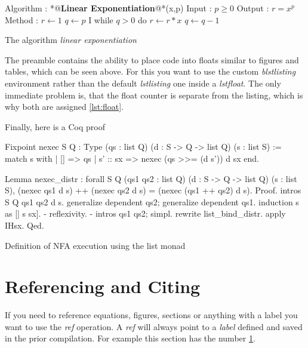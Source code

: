 \documentclass[a4, english]{article}
\begin{document}
\begin{lstfloat}
  \centering
  
  \begin{blstlisting}[firstnumber=1]
  Algorithm : *@\textbf{Linear Exponentiation}@*(x,p)
  Input     : $p \geq 0$
  Output    : $r = x^p$
  Method    : $r \leftarrow 1$
              $q \leftarrow p$
              {I} while $q > 0$ do
                  $r \leftarrow r * x$
                  $q \leftarrow q - 1$
  \end{blstlisting}

  \caption{The algorithm \emph{linear exponentiation}}
  \label{lst:float}
\end{lstfloat}

The preamble contains the ability to place code into floats similar to
figures and tables, which can be seen above. For this you want to use the custom
\emph{blstlisting} environment rather than the default \emph{lstlisting} one
inside a \emph{lstfloat}. The only immediate problem is, that the float counter
is separate from the listing, which is why both are assigned \ref{lst:float}.

Finally, here is a Coq proof

\begin{lstfloat}[ht!]
  \centering

  \begin{blstlisting}[language=coq]
  Fixpoint nexec {S Q : Type}
                 (qs : list Q) (d : S -> Q -> list Q) (s : list S) :=
    match s with
    | []       => qs
    | s' :: sx => nexec (qs >>= (d s')) d sx
    end.

  Lemma nexec_distr :
    forall {S Q} (qs1 qs2 : list Q)
                 (d : S -> Q -> list Q) (s : list S),
      (nexec qs1 d s) ++ (nexec qs2 d s) = (nexec (qs1 ++ qs2) d s).
  Proof.
    intros S Q qs1 qs2 d s.
    generalize dependent qs2; generalize dependent qs1.
    induction s as [| s sx].
    - reflexivity.
    - intros qs1 qs2; simpl. rewrite list_bind_distr. apply IHsx.
  Qed.
  \end{blstlisting}

  \caption{Definition of NFA execution using the list monad}
\end{lstfloat}

\section{Referencing and Citing} \label{sec:ref}
If you need to reference equations, figures, sections or anything with a label
you want to use the \emph{ref} operation. A \emph{ref} will always point to a
\emph{label} defined and saved in the prior compilation. For example this
section has the number \ref{sec:ref}.
\end{document}

